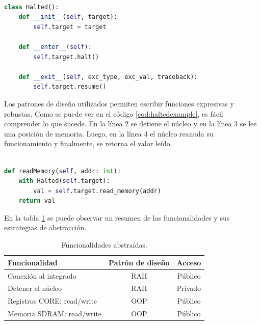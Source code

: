 \begin{lstlisting}[language=Python,label=cod:halted,caption=Ejemplo de \emph{Resource Acquisition Is Initialization (RAII)}.]  % Start your code-block

class Halted():
    def __init__(self, target):
        self.target = target

    def __enter__(self):
        self.target.halt()

    def __exit__(self, exc_type, exc_val, traceback):
        self.target.resume()

\end{lstlisting}

Los patrones de diseño utilizados permiten escribir funciones expresivas y robustas.
Como se puede ver en el código \ref{cod:haltedexample}, es fácil comprender lo que sucede.
En la línea 2 se detiene el núcleo y en la línea 3 se lee una posición de memoria.
Luego, en la línea 4 el núcleo reanuda su funcionamiento y finalmente, se retorna el valor leído.

\newpage

\begin{lstlisting}[language=Python,label=cod:haltedexample,caption=Ejemplo de uso de \emph{RAII}.]  % Start your code-block

def readMemory(self, addr: int):
    with Halted(self.target):
        val = self.target.read_memory(addr)
    return val

\end{lstlisting}

En la tabla \ref{tab:funcionalidades} se puede observar un resumen de las funcionalidades y sus estrategias de abstracción.

\begin{table}[h]
	\centering
	\caption[Funcionalidades abstraidas]{Funcionalidades abstraídas.}

	\begin{tabular}{l c c}    
		\toprule
        \textbf{Funcionalidad}     & \textbf{Patrón de diseño} & \textbf{Acceso}\\
		\midrule
		Conexión al integrado      & RAII                      & Público\\		
		Detener el núcleo          & RAII                      & Privado\\
		Registros CORE: read/write & OOP                       & Público\\
		Memoria SDRAM: read/write  & OOP                       & Público\\
		\bottomrule
		\hline
	\end{tabular}
	\label{tab:funcionalidades}
\end{table}

